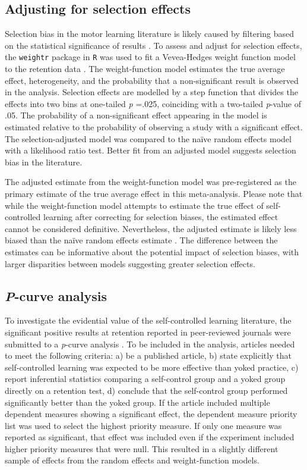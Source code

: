 \documentclass[man,floatsintext,hidelinks]{apa7}
\begin{document}
\subsection{Adjusting for selection effects}
Selection bias in the motor learning literature is likely caused by filtering based on the statistical significance of results \parencite{Lohse2016-cf}. To assess and adjust for selection effects, the \texttt{weightr} package \parencite{Coburn2017-hv} in \texttt{R} was used to fit a Vevea-Hedges weight function model to the retention data \parencite{Vevea1995-uv}. The weight-function model estimates the true average effect, heterogeneity, and the probability that a non-significant result is observed in the analysis. Selection effects are modelled by a step function that divides the effects into two bins at one-tailed \emph{p} =.025, coinciding with a two-tailed \emph{p}-value of .05. The probability of a non-significant effect appearing in the model is estimated relative to the probability of observing a study with a significant effect. The selection-adjusted model was compared to the naïve random effects model with a likelihood ratio test. Better fit from an adjusted model suggests selection bias in the literature.

The adjusted estimate from the weight-function model was pre-registered as the primary estimate of the true average effect in this meta-analysis. Please note that while the weight-function model attempts to estimate the true effect of self-controlled learning after correcting for selection biases, the estimated effect cannot be considered definitive. Nevertheless, the adjusted estimate is likely less biased than the naïve random effects estimate \parencite{Vevea1995-uv}. The difference between the estimates can be informative about the potential impact of selection biases, with larger disparities between models suggesting greater selection effects. 

\subsection{\emph{P}-curve analysis}
To investigate the evidential value of the self-controlled learning literature, the significant positive results at retention reported in peer-reviewed journals were submitted to a \emph{p}-curve analysis \parencite{Simonsohn2015-mn}. To be included in the analysis, articles needed to meet the following criteria: a) be a published article, b) state explicitly that self-controlled learning was expected to be more effective than yoked practice, c) report inferential statistics comparing a self-control group and a yoked group directly on a retention test, d) conclude that the self-control group performed significantly better than the yoked group. If the article included multiple dependent measures showing a significant effect, the dependent measure priority list was used to select the highest priority measure. If only one measure was reported as significant, that effect was included even if the experiment included higher priority measures that were null. This resulted in a slightly different sample of effects from the random effects and weight-function models.
\end{document}
